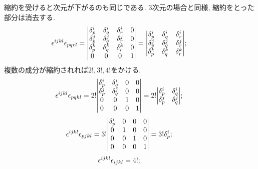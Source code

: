 \documentclass[dvipdfmx]{jsarticle}
\begin{document}
縮約を受けると次元が下がるのも同じである.
3次元の場合と同様, 縮約をとった部分は消去する.
\begin{align*}
    \epsilon^{ijkl}\epsilon_{pqrl}
    &=
    \mqty|
        \delta^i_p & \delta^i_q & \delta^i_r & 0
        \\
        \delta^j_p & \delta^j_q & \delta^j_r & 0
        \\
        \delta^k_p & \delta^k_q & \delta^k_r & 0
        \\
        0 & 0 & 0 & 1
    |
    =
    \mqty|
    \delta^i_p & \delta^i_q & \delta^i_r
    \\
    \delta^j_p & \delta^j_q & \delta^j_r
    \\
    \delta^k_p & \delta^k_q & \delta^k_r
    |;
    \qquad
    \vcenter{\hbox{}}
\end{align*}
複数の成分が縮約されれば$2!,3!,4!$をかける.
\begin{align*}
    \epsilon^{ijkl}\epsilon_{pqkl}
    &=
    2!
    \mqty|
        \delta^i_p & \delta^i_q & 0 & 0
        \\
        \delta^j_p & \delta^j_q & 0 & 0
        \\
        0 & 0 & 1 & 0
        \\
        0 & 0 & 0 & 1
    |
    =
    2!
    \mqty|
        \delta^i_p & \delta^i_q
        \\
        \delta^j_p & \delta^j_q
    |;
    \qquad
    \vcenter{\hbox{}}
\end{align*}
\begin{align*}
    \epsilon^{ijkl}\epsilon_{pjkl}
    &=
    3!
    \mqty|
        \delta^i_p & 0 & 0 & 0
        \\
        0 & 1 & 0 & 0
        \\
        0 & 0 & 1 & 0
        \\
        0 & 0 & 0 & 1
    |
    =
    3!
    \delta^i_p;
    \qquad
    \vcenter{\hbox{}}
\end{align*}
\begin{align*}
    \epsilon^{ijkl}\epsilon_{ijkl}
    &=
    4!;
    \qquad
    \vcenter{\hbox{}}
\end{align*}
\end{document}
